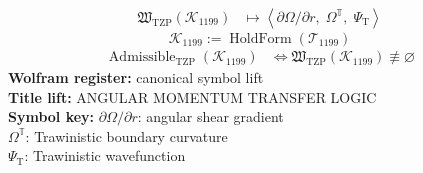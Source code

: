 \noindent
\begin{minipage}[t]{0.48\linewidth}
\begingroup
\small
\[
\begin{aligned}
\mathfrak{W}_{\mathrm{TZP}}\!\left(\mathcal{K}_{1199}\right)
&\longmapsto
\left\langle \partial\Omega/\partial r,\; \Omega^{\mathbb{T}},\; \Psi_{\mathrm{T}} \right\rangle
\end{aligned}
\]
\[
\mathcal{K}_{1199}
:=
\operatorname{HoldForm}\!\left(\mathcal{T}_{1199}\right)
\]
\[
\begin{aligned}
\operatorname{Admissible}_{\mathrm{TZP}}\!\left(\mathcal{K}_{1199}\right)
&\Longleftrightarrow
\mathfrak{W}_{\mathrm{TZP}}\!\left(\mathcal{K}_{1199}\right)\not\equiv\varnothing
\end{aligned}
\]
\textbf{Wolfram register:} canonical symbol lift\\
\textbf{Title lift:} ANGULAR MOMENTUM TRANSFER LOGIC\\
\textbf{Symbol key:} \(\partial\Omega/\partial r\): angular shear gradient\\ \(\Omega^{\mathbb{T}}\): Trawinistic boundary curvature\\ \(\Psi_{\mathrm{T}}\): Trawinistic wavefunction
\par
\endgroup
\end{minipage}\hfill
